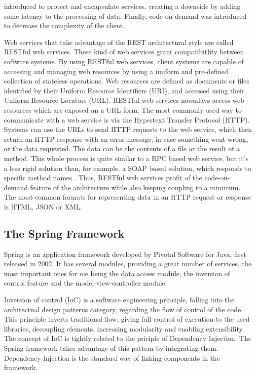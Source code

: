 \documentclass[12pt,a4paper,twoside]{report}
\begin{document}
introduced to protect and encapsulate services, creating a downside by adding some latency to the processing of data. Finally, code-on-demand was introduced to decrease the complexity of the client.

Web services that take advantage of the REST architectural style are called RESTful web services. These kind of web services grant compatibitlity between software systems. By using RESTful web services, client systems are capable of accessing and managing web resources by using a uniform and pre-defined collection of stateless operations. Web resources are defined as documents or files identified by their Uniform Resource Identifiers (URI), and accessed using their Uniform Resource Locators (URL). RESTful web services nowadays access web resources which are exposed an a URL form. The most commonly used way to communicate with a web service is via the Hypertext Transfer Protocol (HTTP). Systems can use the URLs to send HTTP requests to the web service, which then return an HTTP response with an error message, in case something went wrong, or the data requested. The data can be the contents of a file or the result of a method. This whole process is quite similar to a RPC based web service, but it's a less rigid solution than, for example, a SOAP based solution, which responds to specific method names \cite{resftul_web_services}. Thus, RESTful web services profit of the code-on-demand feature of the architecture while also keeping coupling to a minimum. The most common formats for representing data in an HTTP request or response is HTML, JSON or XML.


\subsection{The Spring Framework}
Spring is an application framework developed by Pivotal Software for Java, first released in 2002. It has several modules, providing a great number of services, the most important ones for me being the data access module, the inversion of control feature and the model-view-controller module.

Inversion of control (IoC) is a software engineering principle, falling into the architectual design patterns category, regarding the flow of control of the code. This principle inverts traditional flow, giving full control of execution to the used libraries, decoupling elements, increasing modularity and enabling extensibility. The concept of IoC is tightly related to the priciple of Dependency Injection. The Spring framework takes advantage of this pattern by integrating them. Dependency Injection is the standard way of linking components in the framework.
\end{document}
